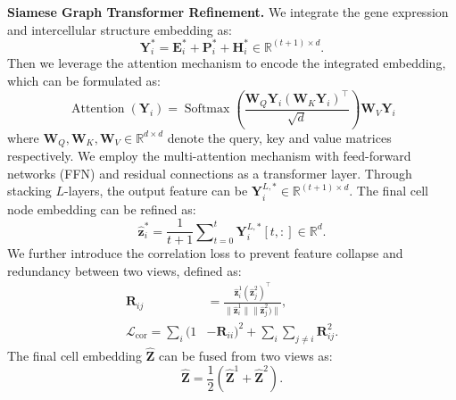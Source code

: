 \smallskip\noindent\textbf{Siamese Graph Transformer Refinement.}
We integrate the gene expression and intercellular structure embedding as:
\begin{equation}
    \bm{Y}_i^* = \bm{E}_i^* + \bm{P}_i^* + \bm{H}_i^*\in\mathbb{R}^{(t+1)\times d}.
\end{equation}
Then we leverage the attention mechanism to encode the integrated embedding, which can be formulated as:
\begin{equation}
    \!\!\!\!\operatorname{Attention}(\bm{Y}_i)=\operatorname{Softmax}\left(\frac{\bm{W}_Q\bm{Y}_i(\bm{W}_K\bm{Y}_i)^\top}{\sqrt{d}}\right)\bm{W}_V\bm{Y}_i
\end{equation}
where $\bm{W}_Q,\bm{W}_K,\bm{W}_V\in\mathbb{R}^{d\times d}$ denote the query, key and value matrices respectively. We employ the multi-attention mechanism with feed-forward networks (FFN) and residual connections as a transformer layer. Through stacking $L$-layers, the output feature can be $\bm{Y}_i^{L,*}\in\mathbb{R}^{(t+1)\times d}$. The final cell node embedding can be refined as:
\begin{equation}
    \hat{\bm{z}}_i^*=\frac{1}{t+1}\sum\nolimits_{t=0}^t\bm{Y}_i^{L,*}[t,:]\in\mathbb{R}^d.
\end{equation}
We further introduce the correlation loss to prevent feature collapse and redundancy between two views, defined as:
\begin{equation}
\begin{aligned}
    \bm{R}_{ij}&=\frac{\hat{\bm{z}}_i^1(\hat{\bm{z}}_j^2)^\top}{\|\hat{\bm{z}}_i^1\|\|\hat{\bm{z}}_j^2)\|},\\
    \mathcal{L}_{\text{cor}}=\sum\nolimits_{i}(1&-\bm{R}_{ii})^2+\sum\nolimits_i\sum\nolimits_{j\neq i}\bm{R}_{ij}^2.
\end{aligned}
\end{equation}
The final cell embedding $\hat{\bm{Z}}$ can be fused from two views as: 
\begin{equation}
    \hat{\bm{Z}}=\frac{1}{2}(\hat{\bm{Z}}^1+\hat{\bm{Z}}^2).
\end{equation}



